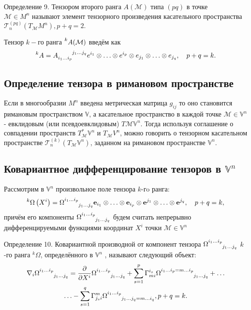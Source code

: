 \documentclass[14pt,a4paper]{scrartcl}
\begin{document}
Определение 9. Тензором второго ранга $A(\mathcal{M})$ типа $(pq)$ в точке \\$\mathcal{M} \in M^n$ называют элемент тензорного произведения касательного пространства $\mathcal{T}_n^{(pq)} (T_{\mathcal{M}}M^n), p+q=2$.

Тензор $k-$го ранга $\prescript{k}{}{A(\mathcal{M})}$ введём как 
\begin{equation}\label{eq22}
	\prescript{k}{}{A} = A\indices{_{i_1\ldots i_p}^{j_1 \ldots j_q}} e^{i_1} \otimes \ldots \otimes e^{i_p} \otimes e_{j_1} \otimes \ldots \otimes e_{j_q}, \quad p+q=k.
\end{equation}

\subsection{Определение тензора в римановом пространстве}
Если в многообразии $M^n$ введена метрическая матрица $g_{ij}$ то оно становится римановым пространством $\mathbb{V}$, а касательное пространство в каждой точке $\mathcal{M} \in \mathbb{V}^n$ - евклидовым (или псевдоевклидовым) $T\mathcal{M} \mathbb{V}^n$. Тогда используя соглашение о совпадении пространств $T_{\mathcal{M}}^*\mathbb{V}^n$ и $T_{\mathcal{M}}V^n$, можно говорить о тензорном касательном пространстве $\mathcal{T}_n^{(k)}(T_{\mathcal{M}}\mathbb{V}^n)$, заданном на римановом пространстве $\mathbb{V}^n$.


\subsection{Ковариантное дифференцирование тензоров в $\mathbb{V}^n$}
Рассмотрим в $\mathbb{V}^n$ произвольное поле тензора $k$-гo ранга:
\begin{equation}\label{eq23}
	^{k} \Omega\left(X^{i}\right)=\Omega\indices{^{i_{1} \ldots i_{p}}_{j_1 \ldots j_q }} \mathbf{e}_{i_{1}} \otimes \ldots \otimes \mathbf{e}_{i_{p}} \otimes \mathbf{e}^{j_{1}} \otimes \ldots \otimes \mathbf{e}^{j_{q}}, \quad p+q=k,
\end{equation}
причём его компоненты $\Omega\indices{^{i_{1} \ldots i_{p}}_{j_1 \ldots j_q }}$ будем считать непрерывно дифференцируемыми функциями координат $X^i$ точки $\mathcal{M} \in \mathbb{V}^n$

Определение 10. Ковариантной производной от компонент тензора $\Omega\indices{^{i_{1} \ldots i_{p}}_{j_1 \ldots j_q }}$ $k$-го ранга $^{k} \Omega$, определённого в $\mathbb{V}^n$ , называют следующий объект:
\begin{multline}\label{eq24}
	\nabla_i \Omega\indices{^{i_{1} \ldots i_{p}}_{j_1 \ldots j_q }} = \pdv{}{X^i} \Omega\indices{^{i_{1} \ldots i_{p}}_{j_1 \ldots j_q }} + \sum\limits_{s=1}^{p} \Gamma_{mi}^{i_s} \Omega\indices{^{i_{1} \ldots i_{p} = m \ldots i_p}_{j_1 \ldots j_q }} + \ldots \\ 
	\ldots - \sum\limits_{s=1}^q \Gamma_{j_si}^{m} \Omega\indices{^{i_{1} \ldots i_{p}}_{j_1 \ldots j_q = m \ldots i_q}}, p+q=k.
\end{multline}
\end{document}
